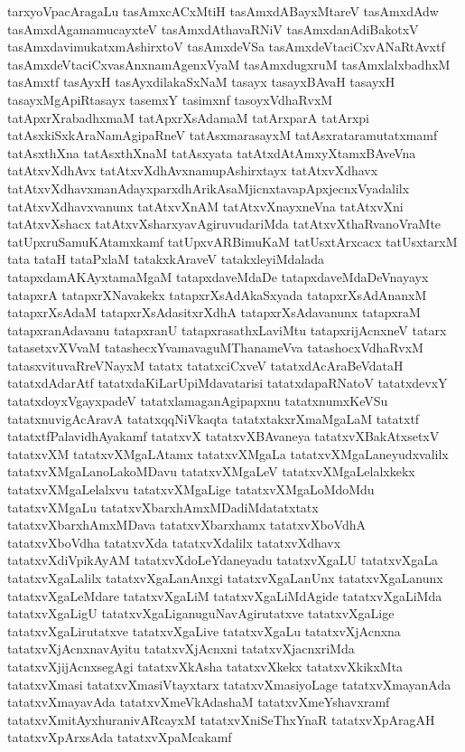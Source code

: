 {tarxyoVpacAragaLu
tasAmxcACxMtiH
tasAmxdABayxMtareV
tasAmxdAdw
tasAmxdAgamamucayxteV
tasAmxdAthavaRNiV
tasAmxdanAdiBakotxV
tasAmxdavimukatxmAshirxtoV
tasAmxdeVSa
tasAmxdeVtaciCxvANaRtAvxtf
tasAmxdeVtaciCxvasAnxnamAgenxVyaM
tasAmxdugxruM
tasAmxlalxbadhxM
tasAmxtf
tasAyxH
tasAyxdilakaSxNaM
tasayx
tasayxBAvaH
tasayxH
tasayxMgApiRtasayx
tasemxY
tasimxnf
tasoyxVdhaRvxM
tatApxrXrabadhxmaM
tatApxrXsAdamaM
tatArxparA
tatArxpi
tatAsxkiSxkAraNamAgipaRneV
tatAsxmarasayxM
tatAsxrataramutatxmamf
tatAsxthXna
tatAsxthXnaM
tatAsxyata
tatAtxdAtAmxyXtamxBAveVna
tatAtxvXdhAvx
tatAtxvXdhAvxnamupAshirxtayx
tatAtxvXdhavx
tatAtxvXdhavxmanAdayxparxdhArikAsaMjicnxtavapApxjecnxVyadalilx
tatAtxvXdhavxvanunx
tatAtxvXnAM
tatAtxvXnayxneVna
tatAtxvXni
tatAtxvXshacx
tatAtxvXsharxyavAgiruvudariMda
tatAtxvXthaRvanoVraMte
tatUpxruSamuKAtamxkamf
tatUpxvARBimuKaM
tatUsxtArxcacx
tatUsxtarxM
tata
tataH
tataPxlaM
tatakxkAraveV
tatakxleyiMdalada
tatapxdamAKAyxtamaMgaM
tatapxdaveMdaDe
tatapxdaveMdaDeVnayayx
tatapxrA
tatapxrXNavakekx
tatapxrXsAdAkaSxyada
tatapxrXsAdAnanxM
tatapxrXsAdaM
tatapxrXsAdasitxrXdhA
tatapxrXsAdavanunx
tatapxraM
tatapxranAdavanu
tatapxranU
tatapxrasathxLaviMtu
tatapxrijAcnxneV
tatarx
tatasetxvXVvaM
tatashecxYvamavaguMThanameVva
tatashocxVdhaRvxM
tatasxvituvaRreVNayxM
tatatx
tatatxciCxveV
tatatxdAcAraBeVdataH
tatatxdAdarAtf
tatatxdaKiLarUpiMdavatarisi
tatatxdapaRNatoV
tatatxdevxY
tatatxdoyxVgayxpadeV
tatatxlamaganAgipapxnu
tatatxnumxKeVSu
tatatxnuvigAcAravA
tatatxqqNiVkaqta
tatatxtakxrXmaMgaLaM
tatatxtf
tatatxtfPalavidhAyakamf
tatatxvX
tatatxvXBAvaneya
tatatxvXBakAtxsetxV
tatatxvXM
tatatxvXMgaLAtamx
tatatxvXMgaLa
tatatxvXMgaLaneyudxvalilx
tatatxvXMgaLanoLakoMDavu
tatatxvXMgaLeV
tatatxvXMgaLelalxkekx
tatatxvXMgaLelalxvu
tatatxvXMgaLige
tatatxvXMgaLoMdoMdu
tatatxvXMgaLu
tatatxvXbarxhAmxMDadiMdatatxtatx
tatatxvXbarxhAmxMDava
tatatxvXbarxhamx
tatatxvXboVdhA
tatatxvXboVdha
tatatxvXda
tatatxvXdalilx
tatatxvXdhavx
tatatxvXdiVpikAyAM
tatatxvXdoLeYdaneyadu
tatatxvXgaLU
tatatxvXgaLa
tatatxvXgaLalilx
tatatxvXgaLanAnxgi
tatatxvXgaLanUnx
tatatxvXgaLanunx
tatatxvXgaLeMdare
tatatxvXgaLiM
tatatxvXgaLiMdAgide
tatatxvXgaLiMda
tatatxvXgaLigU
tatatxvXgaLiganuguNavAgirutatxve
tatatxvXgaLige
tatatxvXgaLirutatxve
tatatxvXgaLive
tatatxvXgaLu
tatatxvXjAcnxna
tatatxvXjAcnxnavAyitu
tatatxvXjAcnxni
tatatxvXjacnxriMda
tatatxvXjijAcnxsegAgi
tatatxvXkAsha
tatatxvXkekx
tatatxvXkikxMta
tatatxvXmasi
tatatxvXmasiVtayxtarx
tatatxvXmasiyoLage
tatatxvXmayanAda
tatatxvXmayavAda
tatatxvXmeVkAdashaM
tatatxvXmeYshavxramf
tatatxvXmitAyxhuranivARcayxM
tatatxvXniSeThxYnaR
tatatxvXpAragAH
tatatxvXpArxsAda
tatatxvXpaMcakamf
}
